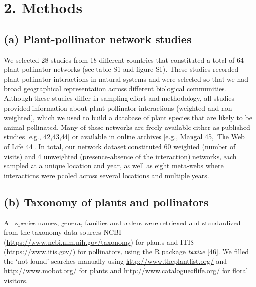 \documentclass[
  12pt,
  a4paper,
]{article}
\begin{document}
\hypertarget{methods}{%
\section{2. Methods}\label{methods}}

\hypertarget{a-plant-pollinator-network-studies}{%
\subsection{(a) Plant-pollinator network studies}\label{a-plant-pollinator-network-studies}}

We selected 28 studies from 18 different countries that constituted a total of 64 plant-pollinator networks (see table S1 and figure S1). These studies recorded plant-pollinator interactions in natural systems and were selected so that we had broad geographical representation across different biological communities. Although these studies differ in sampling effort and methodology, all studies provided information about plant-pollinator interactions (weighted and non-weighted), which we used to build a database of plant species that are likely to be animal pollinated. Many of these networks are freely available either as published studies {[}e.g., \protect\hyperlink{ref-carvalheiro2014}{42},\protect\hyperlink{ref-olesen2007}{43},\protect\hyperlink{ref-fortuna2010}{44}{]} or available in online archives {[}e.g., Mangal \protect\hyperlink{ref-poisot2016}{45},~The Web of Life \protect\hyperlink{ref-fortuna2010}{44}{]}. In total, our network dataset constituted 60 weighted (number of visits) and 4 unweighted (presence-absence of the interaction) networks, each sampled at a unique location and year, as well as eight meta-webs where interactions were pooled across several locations and multiple years.

\hypertarget{b-taxonomy-of-plants-and-pollinators}{%
\subsection{(b) Taxonomy of plants and pollinators}\label{b-taxonomy-of-plants-and-pollinators}}

All species names, genera, families and orders were retrieved and standardized from the taxonomy data sources NCBI (\url{https://www.ncbi.nlm.nih.gov/taxonomy}) for plants and ITIS (\url{https://www.itis.gov/}) for pollinators, using the R package \emph{taxize} {[}\protect\hyperlink{ref-chamberlain2020}{46}{]}. We filled the `not found' searches manually using \url{http://www.theplantlist.org/} and \url{http://www.mobot.org/} for plants and \url{http://www.catalogueoflife.org/} for floral visitors.
\end{document}
